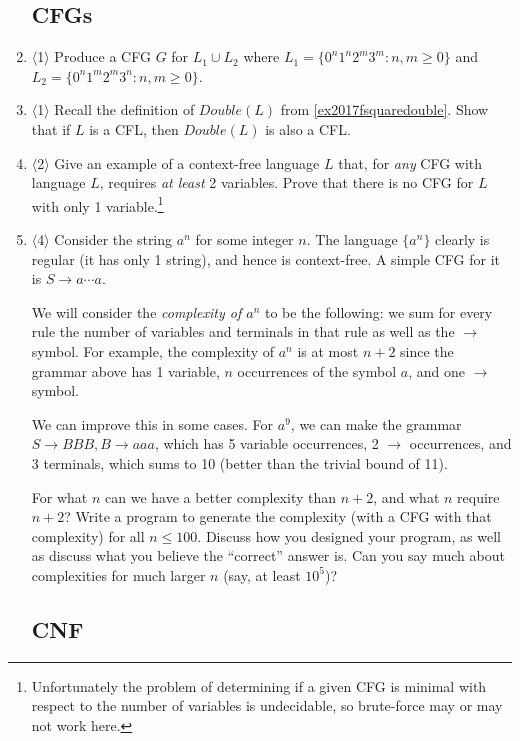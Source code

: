 \documentclass[]{article}
\newcommand{\Level}[1]{{\color{blue} $\langle$#1$\rangle$}}
\begin{document}
\begin{enumerate}
\subsection{CFGs}

\item \label{summer_2017_cfg} \Level{1} Produce a CFG $G$ for $L_1 \cup L_2$ where $L_1 = \{0^n 1^n 2^m 3^m : n,m \ge 0 \}$ and $L_2 = \{0^n 1^m 2^m 3^n : n, m \ge 0 \}$.

\item \Level{1} Recall the definition of $Double(L)$ from \cref{ex2017fsquaredouble}. Show that if $L$ is a CFL, then $Double(L)$ is also a CFL.

\item \Level{2} Give an example of a context-free language $L$ that, for \textit{any} CFG with language $L$, requires \textit{at least} 2 variables. 
Prove that there is no CFG for $L$ with only 1 variable.\footnote{Unfortunately the problem of determining if a given CFG is minimal with respect to the number of variables is undecidable, so brute-force may or may not work here.}

\item \Level{4} Consider the string $a^n$ for some integer $n$. The language $\{a^n\}$ clearly is regular (it has only 1 string), and hence is context-free. A simple CFG for it is $S \to a\cdots a$. 

We will consider the \textit{complexity of $a^n$} to be the following: we sum for every rule the number of variables and terminals in that rule as well as the $\to$ symbol. For example, the complexity of $a^n$ is at most $n+2$ since the grammar above has 1 variable, $n$ occurrences of the symbol $a$, and one $\to$ symbol.

We can improve this in some cases. For $a^9$, we can make the grammar $S \to BBB, B \to aaa$, which has 5 variable occurrences, 2 $\to$ occurrences, and 3 terminals, which sums to 10 (better than the trivial bound of 11).

For what $n$ can we have a better complexity than $n+2$, and what $n$ require $n+2$?
Write a program to generate the complexity (with a CFG with that complexity) for all $n \le 100$. 
Discuss how you designed your program, as well as discuss what you believe the ``correct'' answer is. 
Can you say much about complexities for much larger $n$ (say, at least $10^5$)?

\subsection{CNF}


\end{enumerate}
\end{document}
